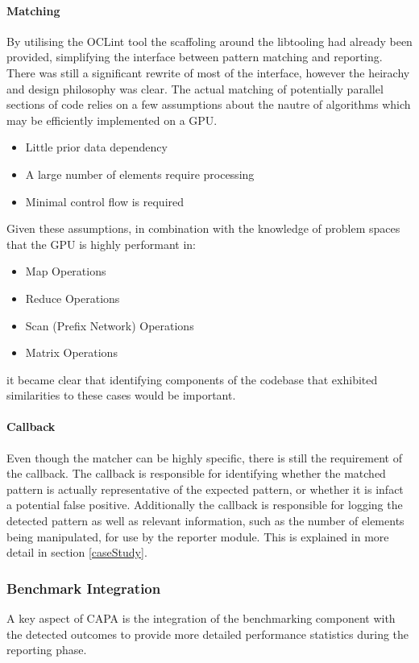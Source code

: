 \paragraph{Matching}
By utilising the OCLint tool the scaffoling around the libtooling had already been provided,
simplifying the interface between pattern matching and reporting. There was still a significant
rewrite of most of the interface, however the heirachy and design philosophy was clear. The actual
matching of potentially parallel sections of code relies on a few assumptions about the nautre of
algorithms which may be efficiently implemented on a GPU.
\begin{itemize}
    \item Little prior data dependency
    \item A large number of elements require processing
    \item Minimal control flow is required
\end{itemize}
Given these assumptions, in combination with the knowledge of problem spaces that the GPU is highly
performant in:
\begin{itemize}
    \item Map Operations
    \item Reduce Operations
    \item Scan (Prefix Network) Operations
    \item Matrix Operations
\end{itemize}
it became clear that identifying components of the codebase that exhibited similarities to these
cases would be important. 

\paragraph{Callback}
Even though the matcher can be highly specific, there is still the requirement of the callback. The
callback is responsible for identifying whether the matched pattern is actually representative of
the expected pattern, or whether it is infact a potential false positive. Additionally the callback
is responsible for logging the detected pattern as well as relevant information, such as the number
of elements being manipulated, for use by the reporter module. This is explained in more detail
in section \ref{caseStudy}.

\subsubsection{Benchmark Integration}
A key aspect of CAPA is the integration of the benchmarking component with the detected outcomes to
provide more detailed performance statistics during the reporting phase.

